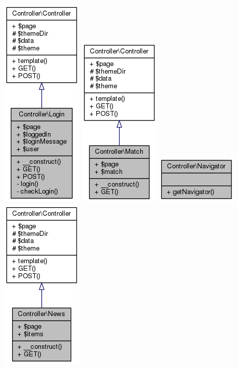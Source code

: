 \documentclass[11pt]{article}
\begin{document}
\includegraphics[scale=0.4]{UML_Controller_1_1Login.png}
\includegraphics[scale=0.4]{UML_Controller_1_1Match.png}
\includegraphics[scale=0.4]{UML_Controller_1_1Navigator.png}
\includegraphics[scale=0.4]{UML_Controller_1_1News.png}
\end{document}
